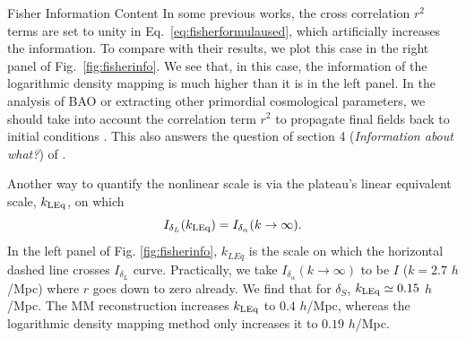 \begin{section}{Fisher Information Content}
  In some previous works, the cross correlation $r^2$ terms are set
  to unity in Eq.~\ref{eq:fisherformulaused}, which artificially
  increases the information. To compare with their results, we plot this case in the right panel of 
  Fig.~\ref{fig:fisherinfo}.  We see that, in this case, the information of the logarithmic density
  mapping is much higher than it is in the left panel.
  In the analysis of BAO or extracting other primordial cosmological
  parameters, we should take into account the correlation term $r^2$
  to propagate final fields back to initial conditions \citep{bib:HarnoisD2013}.
  This also answers the question of section 4
  ({\it Information about what?}) of \citet{bib:HarnoisD2013}.

  Another way to quantify the nonlinear scale is via the plateau's linear equivalent scale, $k_{\rm LEq}$, on which 
  \begin{equation}
      I_{\delta_L}(k_{\rm LEq})=I_{\delta_{\alpha}}(k\rightarrow\infty).
  \end{equation}
  In the left panel of Fig. \ref{fig:fisherinfo}, $k_{LEq}$ is the scale on which 
  the horizontal dashed line crosses $I_{\delta_{L}}$ curve.
  Practically, we take $I_{\delta_{\alpha}}(k\rightarrow\infty)$ to be
  $I$ ($k=2.7$ $h$/Mpc) where $r$ goes down to zero already.  We find that
  for $\delta_S$, $k_{\rm LEq}\simeq 0.15$ $h$/Mpc.
  The MM reconstruction increases $k_{\rm LEq}$ to $0.4$ $h$/Mpc,
  whereas the logarithmic density mapping method only increases it to $0.19$ $h$/Mpc.


\end{section}
